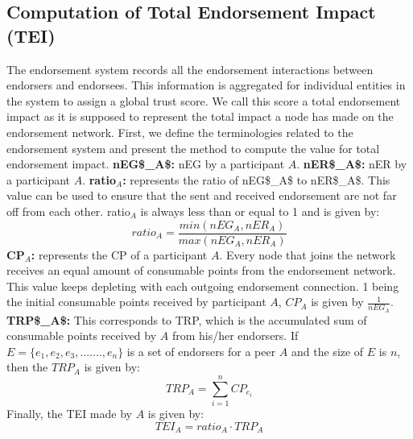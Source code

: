 \subsection{Computation of Total Endorsement Impact (TEI)} \label{computetei}
The endorsement system records all the endorsement interactions between
endorsers and endorsees. This information is aggregated for individual entities
in the system to assign a global trust score. We call this score a total
endorsement impact as it is supposed to represent the total impact a node has
made on the endorsement network. First, we define the terminologies related to
the endorsement system and present the method to compute the value for total
endorsement impact.\newline 
\textbf{{\acrshort{nEG$_A$:}}} \ac{nEG} by a participant $A$. \newline
\textbf{{\acrshort{nER$_A$:}}} \ac{nER} by a participant $A$. \newline
\textbf{ratio$_A$:} represents the ratio of \acrshort{nEG$_A$} to
\acrshort{nER$_A$}. This value can be used to ensure that the sent and received
endorsement are not far off from each other. ratio$_{A}$ is always less than or
equal to 1 and is given by:   
\begin{equation}
	ratio_A = \frac{min(nEG_A, nER_A)}{max(nEG_A, nER_A)}
\end{equation}
\textbf{\acrshort{CP}$_A$:} represents the \ac{CP} of a participant $A$. Every
node that joins the network receives an equal amount of consumable points from
the endorsement network. This value keeps depleting with each outgoing
endorsement connection. 1 being the initial consumable points received by
participant $A$, $CP_{A}$ is given by $\frac{1}{nEG_A}$.\newline
\textbf{\acrshort{TRP$_A$}:} This corresponds to \ac{TRP}, which is the
accumulated sum of consumable points received by $A$ from his/her endorsers.
\newline
If $E = \{e_{1}, e_{2}, e_{3}, ......., e_{n}\}$ is a set of endorsers for a
peer $A$ and the size of $E$ is $n$, then the $TRP_{A}$ is given by:
\begin{equation}
	TRP_A = \sum_{i=1}^{n}CP_{e_{i}}
\end{equation}
Finally, the \ac{TEI} made by $A$ is given by: 
\begin{equation}
	TEI_A = ratio_A \cdot TRP_A
\end{equation}

